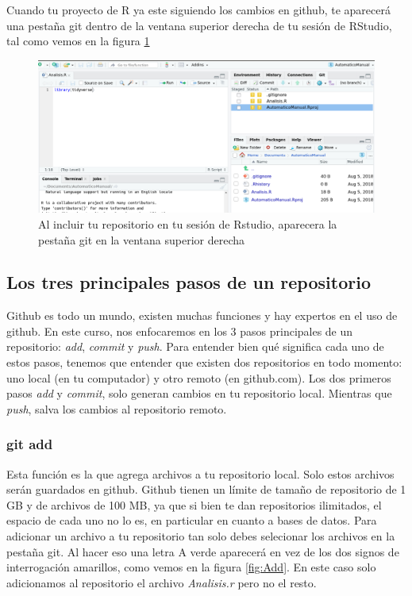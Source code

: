 \documentclass[]{book}
\begin{document}
Cuando tu proyecto de R ya este siguiendo los cambios en github, te
aparecerá una pestaña git dentro de la ventana superior derecha de tu
sesión de RStudio, tal como vemos en la figura \ref{fig:GitPan}

\begin{figure}

{\centering \includegraphics[width=0.8\linewidth]{GitPan} 

}

\caption{Al incluir tu repositorio en tu sesión de Rstudio, aparecera la pestaña git en la ventana superior derecha}\label{fig:GitPan}
\end{figure}

\hypertarget{los-tres-principales-pasos-de-un-repositorio}{%
\subsection{Los tres principales pasos de un
repositorio}\label{los-tres-principales-pasos-de-un-repositorio}}

Github es todo un mundo, existen muchas funciones y hay expertos en el
uso de github. En este curso, nos enfocaremos en los 3 pasos principales
de un repositorio: \emph{add}, \emph{commit} y \emph{push}. Para
entender bien qué significa cada uno de estos pasos, tenemos que
entender que existen dos repositorios en todo momento: uno local (en tu
computador) y otro remoto (en github.com). Los dos primeros pasos
\emph{add} y \emph{commit}, solo generan cambios en tu repositorio
local. Mientras que \emph{push}, salva los cambios al repositorio
remoto.

\hypertarget{git-add}{%
\subsubsection{git add}\label{git-add}}

Esta función es la que agrega archivos a tu repositorio local. Solo
estos archivos serán guardados en github. Github tienen un límite de
tamaño de repositorio de 1 GB y de archivos de 100 MB, ya que si bien te
dan repositorios ilimitados, el espacio de cada uno no lo es, en
particular en cuanto a bases de datos. Para adicionar un archivo a tu
repositorio tan solo debes selecionar los archivos en la pestaña git. Al
hacer eso una letra A verde aparecerá en vez de los dos signos de
interrogación amarillos, como vemos en la figura \ref{fig:Add}. En este
caso solo adicionamos al repositorio el archivo \emph{Analisis.r} pero
no el resto.
\end{document}
